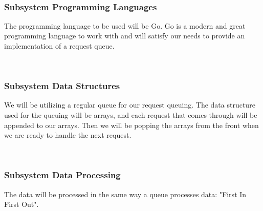 \\
\subsubsection{Subsystem Programming Languages}
The programming language to be used will be Go. Go is a modern and great programming language to work with and will satisfy our needs to provide an implementation of a request queue.

\\
\subsubsection{Subsystem Data Structures}
We will be utilizing a regular queue for our request queuing. The data structure used for the queuing will be arrays, and each request that comes through will be appended to our arrays. Then we will be popping the arrays from the front when we are ready to handle the next request.

\\
\subsubsection{Subsystem Data Processing}
The data will be processed in the same way a queue processes data: "First In First Out".

\newpage